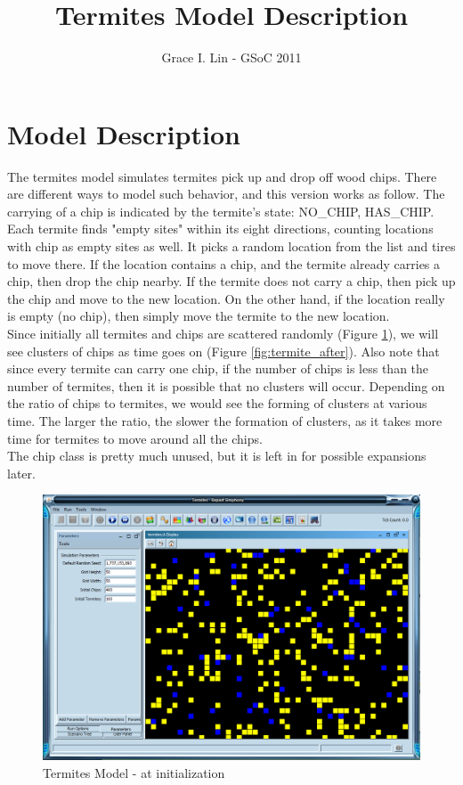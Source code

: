 \documentclass[11pt]{amsart}
\title{Termites Model Description}
\author{Grace I. Lin - GSoC 2011}
\begin{document}
 
\maketitle

\tableofcontents 

\section{Model Description}
The termites model simulates termites pick up and drop off wood chips.  There are different ways to model such behavior, and this version works as follow.  The carrying of a chip is indicated by the termite's state: NO\_CHIP, HAS\_CHIP.  Each termite finds "empty sites" within its eight directions, counting locations with chip as empty sites as well.  It picks a random location from the list and tires to move there.  If the location contains a chip, and the termite already carries a chip, then drop the chip nearby.  If the termite does not carry a chip, then pick up the chip and move to the new location.  On the other hand, if the location really is empty (no chip), then simply move the termite to the new location.\\

Since initially all termites and chips are scattered randomly (Figure \ref{fig:termite_before}), we will see clusters of chips as time goes on (Figure \ref{fig:termite_after}).  Also note that since every termite can carry one chip, if the number of chips is less than the number of termites, then it is possible that no clusters will occur.  Depending on the ratio of chips to termites, we would see the forming of clusters at various time.  The larger the ratio, the slower the formation of clusters, as it takes more time for termites to move around all the chips.\\

The chip class is pretty much unused, but it is left in for possible expansions later.

\begin{figure}[h]
\begin{center}
\vspace{.2in}
\centerline {
\includegraphics[width=5in]{Images/termite_before.png}}
\caption{Termites Model - at initialization}
\label{fig:termite_before}
\end{center}
\end{figure}
\end{document}
